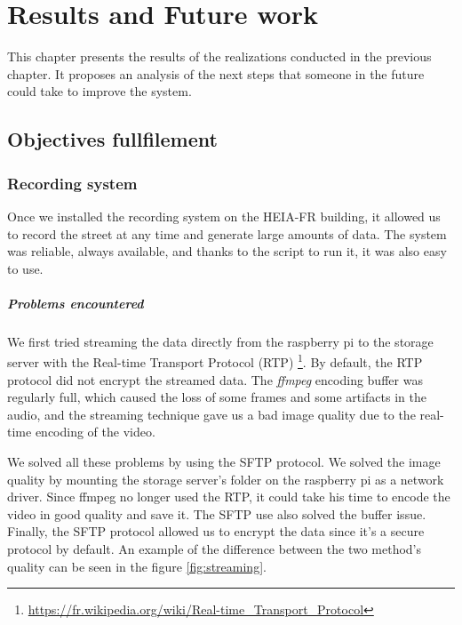 \chapter{Results and Future work}
\label{ch:results}

This chapter presents the results of the realizations conducted in the previous chapter. It proposes an analysis of the next steps that someone in the future could take to improve the system.

\section{Objectives fullfilement}
\subsection{Recording system}

Once we installed the recording system on the HEIA-FR building, it allowed us to record the street at any time and generate large amounts of data. The system was reliable, always available, and thanks to the script to run it, it was also easy to use.

\paragraph*{Problems encountered}

We first tried streaming the data directly from the raspberry pi to the storage server with the Real-time Transport Protocol (RTP) \footnote{\url{https://fr.wikipedia.org/wiki/Real-time\_Transport\_Protocol}}. By default, the RTP protocol did not encrypt the streamed data. The \textit{ffmpeg} encoding buffer was regularly full, which caused the loss of some frames and some artifacts in the audio, and the streaming technique gave us a bad image quality due to the real-time encoding of the video.

We solved all these problems by using the SFTP protocol. We solved the image quality by mounting the storage server's folder on the raspberry pi as a network driver. Since ffmpeg no longer used the RTP, it could take his time to encode the video in good quality and save it. The SFTP use also solved the buffer issue. Finally, the SFTP protocol allowed us to encrypt the data since it's a secure protocol by default. An example of the difference between the two method's quality can be seen in the figure \ref{fig:streaming}.


